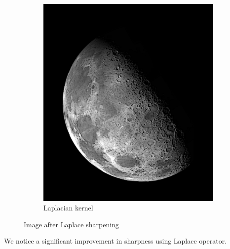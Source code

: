 \documentclass[UTF8]{ctexart}
\begin{document}
\begin{figure}[htbp]
\begin{subfigure}{0.3\textwidth}
        \includegraphics[width=\linewidth]{moon_laplace_sharpen.png}
        \caption{Laplacian kernel}
    \end{subfigure}

    \caption{Image after Laplace sharpening}
\end{figure}

We notice a significant improvement in sharpness using Laplace operator.\\
\end{document}
